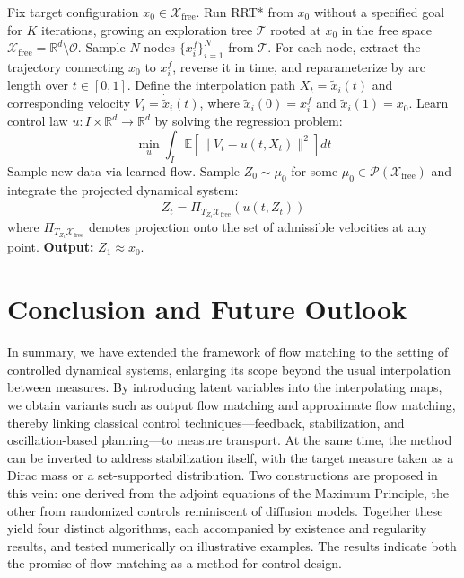 \documentclass{article}
\begin{document}
\begin{algorithm}
\caption{Flow Matching for Path Planning via RRT* and Time Reversal}
\label{alg:rrt-flow-matching}
\begin{algorithmic}[1]
\State Fix target configuration $x_0 \in \mathcal{X}_{\mathrm{free}}$. Run RRT* from $x_0$ without a specified goal for $K$ iterations, growing an exploration tree $\mathcal{T}$ rooted at $x_0$ in the free space $\mathcal{X}_{\mathrm{free}} = \mathbb{R}^d \setminus \mathcal{O}$.
\State Sample $N$ nodes $\{x_i^f\}_{i=1}^N$ from $\mathcal{T}$. For each node, extract the trajectory connecting $x_0$ to $x_i^f$, reverse it in time, and reparameterize by arc length over $t \in [0,1]$. 
\State Define the interpolation path $X_t = \tilde{x}_i(t)$ and corresponding velocity $V_t = \dot{\tilde{x}}_i(t)$, where $\tilde{x}_i(0) = x_i^f$ and $\tilde{x}_i(1) = x_0$.
\State Learn control law $u: I \times \mathbb{R}^d \rightarrow \mathbb{R}^d$ by solving the regression problem:
\[\min_{u} \int_I \mathbb{E}\left[\|V_t - u(t, X_t)\|^2\right] dt\]
\State Sample new data via learned flow. Sample $Z_0 \sim \mu_0$ for some $\mu_0 \in \mathcal{P}(\mathcal{X}_{\mathrm{free}})$ and integrate the projected dynamical system:
\[\dot{Z}_t = \Pi_{T_{Z_t}\mathcal{X}_{\mathrm{free}}}(u(t, Z_t))\]
where $\Pi_{T_{Z_t}\mathcal{X}_{\mathrm{free}}}$ denotes projection onto the set of admissible velocities at any point.
\State \textbf{Output:} $Z_1 \approx x_0$.
\end{algorithmic}
\end{algorithm}




\section{Conclusion and Future Outlook} 
In summary, we have extended the framework of flow matching to the setting of controlled dynamical systems, enlarging its scope beyond the usual interpolation between measures. By introducing latent variables into the interpolating maps, we obtain variants such as output flow matching and approximate flow matching, thereby linking classical control techniques—feedback, stabilization, and oscillation-based planning—to measure transport. At the same time, the method can be inverted to address stabilization itself, with the target measure taken as a Dirac mass or a set-supported distribution. Two constructions are proposed in this vein: one derived from the adjoint equations of the Maximum Principle, the other from randomized controls reminiscent of diffusion models. Together these yield four distinct algorithms, each accompanied by existence and regularity results, and tested numerically on illustrative examples. The results indicate both the promise of flow matching as a method for control design. 
\end{document}
